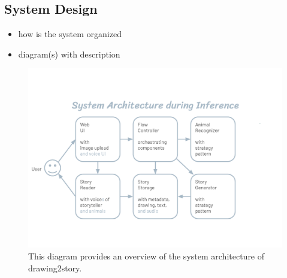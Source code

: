 \subsection{System Design}


\begin{itemize}
    \item how is the system organized
    \item diagram(s) with description
\end{itemize}

\begin{figure}[h]
    \centering
    \includegraphics[scale=0.75]{img/diagrams/drawing2story-system_architecture_during_inference}
    \caption{This diagram provides an overview of the system architecture of drawing2story.}
    \label{fig:System_Architecture_during_Inference}
\end{figure}
